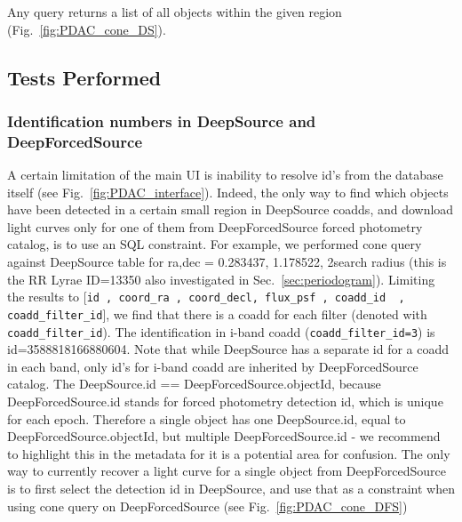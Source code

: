 \documentclass[DM,lsstdraft,toc,usenatbib]{lsstdoc}
\begin{document}
Any query returns a list of all objects within the given region (Fig.~\ref{fig:PDAC_cone_DS}).  


\subsection{Tests Performed}
\subsubsection{Identification numbers in DeepSource and DeepForcedSource}
A certain limitation of the main UI is inability to resolve id's from the database itself (see Fig.~\ref{fig:PDAC_interface}). Indeed, the only way to find which objects have been detected in a certain small region in DeepSource coadds, and download light curves only for one of them  from DeepForcedSource forced photometry catalog, is  to use an  SQL constraint.   For example,  we performed cone query against DeepSource table for ra,dec = 0.283437\degree, 1.178522\degree, 2\arcsec search radius (this is the RR Lyrae ID=13350 also investigated in Sec.~\ref{sec:periodogram}). Limiting the results to [\verb|id , coord_ra , coord_decl, flux_psf , coadd_id  , coadd_filter_id|], we find that there is a coadd for each filter (denoted with \verb|coadd_filter_id|). The identification in i-band coadd (\verb|coadd_filter_id=3|) is id=3588818166880604.  Note that while DeepSource has a separate id for a coadd in each band, only id's for  i-band coadd are inherited by DeepForcedSource  catalog. The DeepSource.id == DeepForcedSource.objectId,  because  DeepForcedSource.id  stands for forced photometry detection id, which is unique for each epoch. Therefore a single object has one DeepSource.id,  equal to DeepForcedSource.objectId, but  multiple  DeepForcedSource.id  - we recommend to highlight this in the metadata for it is a potential area for confusion. The only way to currently recover a light curve for a single object from DeepForcedSource is to  first select the detection id  in DeepSource, and use that as a constraint when using cone query  on DeepForcedSource (see Fig.~\ref{fig:PDAC_cone_DFS})
\end{document}
